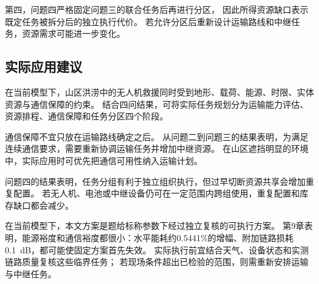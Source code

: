 第四，问题四严格固定问题三的联合任务后再进行分区，
因此所得资源缺口表示既定任务被拆分后的独立执行代价。
若允许分区后重新设计运输路线和中继任务，资源需求可能进一步变化。

\subsection{实际应用建议}

在当前模型下，山区洪涝中的无人机救援同时受到地形、载荷、能源、时限、实体资源与通信保障的约束。
结合四问结果，可将实际任务规划分为运输能力评估、资源排程、通信保障和任务分区四个阶段。

通信保障不宜只放在运输路线确定之后。
从问题二到问题三的结果表明，为满足连续通信要求，需要重新协调运输任务并增加中继资源。
在山区遮挡明显的环境中，实际应用时可优先把通信可用性纳入运输计划。

问题四的结果表明，任务分组有利于独立组织执行，但过早切断资源共享会增加重复配置。
若无人机、电池或中继设备仍可在一定范围内跨组使用，重复配置和库存缺口都会减少。

在当前模型下，本文方案是题给标称参数下经过独立复核的可执行方案。
第9章表明，能源裕度和通信裕度都很小：水平能耗约0.5441\%的增幅、附加链路损耗0.1~dB，都可能使固定方案首先失效。
实际执行前宜结合天气、设备状态和实测链路质量复核这些临界任务；
若现场条件超出已检验的范围，则需重新安排运输与中继任务。